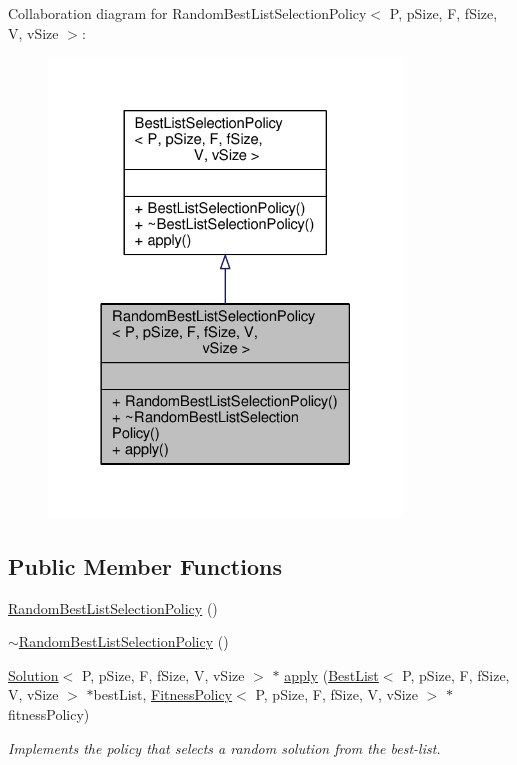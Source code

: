 Collaboration diagram for Random\+Best\+List\+Selection\+Policy$<$ P, p\+Size, F, f\+Size, V, v\+Size $>$\+:\nopagebreak
\begin{figure}[H]
\begin{center}
\leavevmode
\includegraphics[width=266pt]{classRandomBestListSelectionPolicy__coll__graph}
\end{center}
\end{figure}
\subsection*{Public Member Functions}
\begin{DoxyCompactItemize}
\item 
\hyperlink{classRandomBestListSelectionPolicy_abc1f4bb2b43625f4161cf7adc3d9dec8}{Random\+Best\+List\+Selection\+Policy} ()
\item 
\hyperlink{classRandomBestListSelectionPolicy_a2c40baedbdd06e339632890367dfd5db}{$\sim$\+Random\+Best\+List\+Selection\+Policy} ()
\item 
\hyperlink{classSolution}{Solution}$<$ P, p\+Size, F, f\+Size, V, v\+Size $>$ $\ast$ \hyperlink{classRandomBestListSelectionPolicy_ae32f042697269d74c6fed4b9ff6771c8}{apply} (\hyperlink{classBestList}{Best\+List}$<$ P, p\+Size, F, f\+Size, V, v\+Size $>$ $\ast$best\+List, \hyperlink{classFitnessPolicy}{Fitness\+Policy}$<$ P, p\+Size, F, f\+Size, V, v\+Size $>$ $\ast$fitness\+Policy)
\begin{DoxyCompactList}\small\item\em Implements the policy that selects a random solution from the best-\/list. \end{DoxyCompactList}\end{DoxyCompactItemize}


